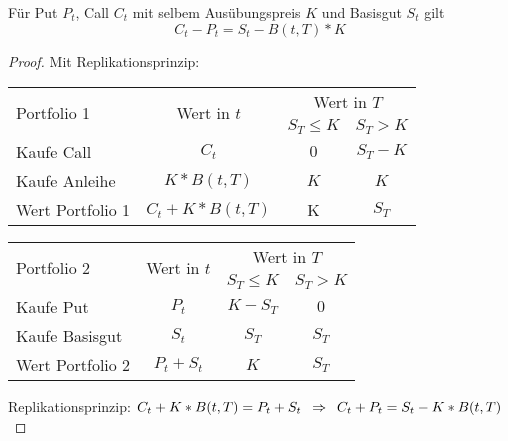 \begin{lemma} %
	Für Put $P_t$, Call $C_t$ mit selbem Ausübungspreis $K$ und Basisgut $S_t$ gilt
	\begin{equation*}
		C_t - P_t = S_t - B(t,T) * K
	\end{equation*}
\end{lemma}
\begin{proof}
	Mit Replikationsprinzip:
	
	\begin{center}
		\begin{tabular}{|l|c|cc|}
			\hline 
			\multirow{2}{*}{Portfolio 1} & \multirow{2}{*}{Wert in $t$} & \multicolumn{2}{c|}{Wert in $T$} \\
			&& $S_T \le K$ & $S_T > K$ \\ \hline \hline
			Kaufe Call & $C_t$ & $0$ & $S_T - K$ \\
			Kaufe Anleihe & $K * B(t,T)$ & $K$ & $K$ \\ \hline
			Wert Portfolio 1 & $C_t + K * B(t,T)$ & K & $S_T$ \\ 
			\hline
		\end{tabular}
	\end{center}

	\begin{center}
		\begin{tabular}{|l|c|cc|}
			\hline 
			\multirow{2}{*}{Portfolio 2} & \multirow{2}{*}{Wert in $t$} & \multicolumn{2}{c|}{Wert in $T$} \\
			&& $S_T \le K$ & $S_T > K$ \\ \hline \hline
			Kaufe Put & $P_t$ & $K - S_T$ & $0$ \\
			Kaufe Basisgut & $S_t$ & $S_T$ & $S_T$ \\ \hline
			Wert Portfolio 2 & $P_t + S_t$ & $K$ & $S_T$ \\ 
			\hline
		\end{tabular}
	\end{center}

	Replikationsprinzip: $C_t + K * B(t,T) = P_t + S_t \enskip \Rightarrow \enskip C_t + P_t = S_t - K*B(t,T)$
\end{proof}